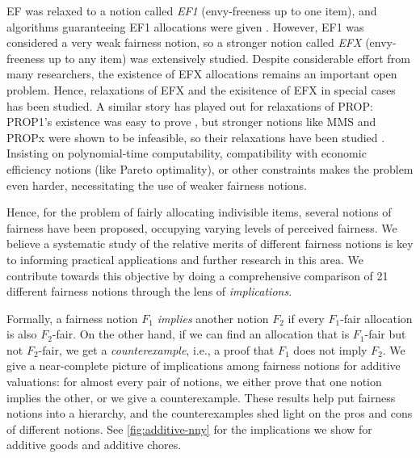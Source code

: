 EF was relaxed to a notion called \emph{EF1} (envy-freeness up to one item),
and algorithms guaranteeing EF1 allocations were given \cite{budish2011combinatorial,lipton2004approximately}.
However, EF1 was considered a very weak fairness notion, so a stronger notion
called \emph{EFX} (envy-freeness up to any item) \cite{caragiannis2019unreasonable} was extensively studied.
Despite considerable effort from many researchers, the existence of EFX allocations
remains an important open problem.
Hence, relaxations of EFX \cite{caragiannis2023new,amanatidis2020multiple,chaudhury2021little}
and the exisitence of EFX in special cases \cite{chaudhury2024efx,plaut2020almost,amanatidis2021maximum}
has been studied.
%
A similar story has played out for relaxations of PROP:
PROP1's existence was easy to prove \cite{aziz2021fair},
but stronger notions like MMS \cite{kurokawa2018fair} and PROPx \cite{aziz2020polynomial}
were shown to be infeasible, so their relaxations have been studied
\cite{kurokawa2018fair,akrami2023breaking,baklanov2021propm,caragiannis2023new}.
Insisting on polynomial-time computability,
compatibility with economic efficiency notions (like Pareto optimality),
or other constraints \cite{bouveret2017fair,biswas2018fair,equbal2024fair}
makes the problem even harder, necessitating the use of weaker fairness notions.

Hence, for the problem of fairly allocating indivisible items,
several notions of fairness have been proposed,
occupying varying levels of perceived fairness.
We believe a systematic study of the relative merits of different fairness notions
is key to informing practical applications and further research in this area.
We contribute towards this objective by doing a
comprehensive comparison of 21 different fairness notions
through the lens of \emph{implications}.

Formally, a fairness notion $F_1$ \emph{implies} another notion $F_2$
if every $F_1$-fair allocation is also $F_2$-fair.
On the other hand, if we can find an allocation that is $F_1$-fair but not $F_2$-fair,
we get a \emph{counterexample}, i.e., a proof that $F_1$ does not imply $F_2$.
We give a near-complete picture of implications among fairness notions for additive valuations:
for almost every pair of notions, we either prove that one notion implies the other, or we give a counterexample.
These results help put fairness notions into a hierarchy,
and the counterexamples shed light on the pros and cons of different notions.
See \cref{fig:additive-nny} for the implications we show for additive goods and additive chores.

